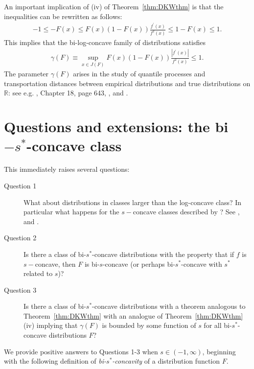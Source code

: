 \documentclass[11pt]{amsart}
\numberwithin{equation}{section}
\newcommand{\RR}{\mathbb{R}}
\theoremstyle{definition}\newtheorem{definition}{Definition}
\theoremstyle{remark}\newtheorem{assumption}{Assumption}
\theoremstyle{remark}\newtheorem{remark}{Remark}
\theoremstyle{definition}\newtheorem{example}{Example}
\theoremstyle{plain}\newtheorem{question}{Question}
\theoremstyle{plain}\newtheorem{theorem}{Theorem}
\theoremstyle{plain}\newtheorem{lemma}{Lemma}
\theoremstyle{plain}\newtheorem{proposition}{Proposition}
\theoremstyle{plain}\newtheorem{corollary}{Corollary}
\theoremstyle{plain}\newtheorem{conjecture}{Conjecture}
\begin{document}
An important implication of (iv) of Theorem~\ref{thm:DKWthm} is that the inequalities can be rewritten as follows:
\begin{eqnarray*}
-1 \le -F(x)  \le F(x) (1-F(x)) \frac{f^{\prime} (x)}{f^2 (x)} \le 1-F(x)  \le 1 .
\end{eqnarray*}
This implies that the bi-log-concave family of distributions satisfies  
\begin{eqnarray}
\gamma (F) \equiv \sup_{x \in J(F)}  F(x) (1-F(x)) \frac{ | f^{\prime} (x) |}{f^2 (x)} \le 1.
\label{GammaFboundedbyOneForLogConcaveF}
\end{eqnarray}
The parameter $\gamma (F)$ arises in the study of quantile processes and transportation  distances between
empirical distributions and true distributions on  $\RR$:  see e.g. 
\cite{MR0501290},  %
\cite{MR838963, MR3396731} Chapter 18, page 643,   %
\cite{Bobkov-Ledoux:2017},  %
and 
\cite{MR2121458}. %

\section{Questions and extensions:  the bi$-s^*$-concave class}
\label{sec:QuestAndExt}

This immediately raises several questions:  
\begin{description}
\item[Question 1]
What about distributions in classes larger than the log-concave class?
In particular what happens for the $s-$concave classes described by 
\cite{MR0404559}? %
See 
\cite{MR954608},  %
and 
\cite{MR0450480}.  %
\item[Question 2] 
Is there a class of  bi-$s^*$-concave distributions with the property that if $f$ is $s-$concave, then
$F$ is bi-$s$-concave (or perhaps bi-$s^*$-concave with $s^*$ related to $s$)?
\item[Question 3]
Is there a class of  bi-$s^*$-concave distributions with a theorem analogous to Theorem~\ref{thm:DKWthm} with 
an analogue of Theorem~\ref{thm:DKWthm}(iv)  implying that $\gamma(F) $ is bounded by some function of $s$ 
for all bi-$s^*$-concave distributions $F$?    
\end{description}

We provide positive answers to Questions 1-3 when $s \in (-1,\infty)$, 
beginning with the following definition 
of {\sl bi-$s^*$-concavity} of a distribution function $F$.
\end{document}
